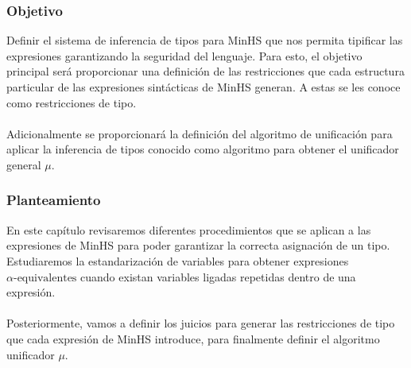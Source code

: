 \subsubsection{Objetivo}
Definir el sistema de inferencia de tipos para \textsf{MinHS} que nos permita tipificar las expresiones garantizando la seguridad del lenguaje. Para esto, el objetivo principal será proporcionar una definición de las restricciones que cada estructura particular de las expresiones sintácticas de \textsf{MinHS} generan. A estas se les conoce como restricciones de tipo. \\\\
Adicionalmente se proporcionará la definición del algoritmo de unificación para aplicar la inferencia de tipos conocido como algoritmo para obtener el unificador general \textbf{$\mu$}.


\subsubsection{Planteamiento}
En este capítulo  revisaremos diferentes  procedimientos que se aplican a las expresiones de \textsf{MinHS} para poder garantizar la correcta  asignación de un tipo.
Estudiaremos la estandarización de variables para obtener expresiones $\alpha\text{-equivalentes}$ cuando existan variables ligadas repetidas dentro de una expresión.\\\\
Posteriormente, vamos a definir los juicios para generar las restricciones de tipo que cada expresión de \textsf{MinHS} introduce, para finalmente definir el algoritmo unificador $\mu$.


